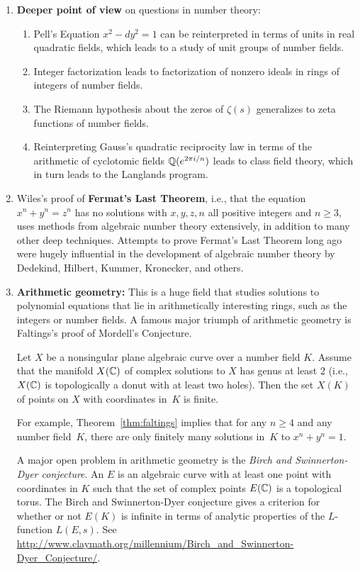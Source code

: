 \begin{enumerate}
\item {\bf Deeper point of view} on questions in number theory:
\begin{enumerate}
\item Pell's Equation $x^2-dy^2=1$ can be reinterpreted in terms of units in real quadratic fields, which
leads to a study of unit groups of number fields.
\item Integer factorization leads to factorization of nonzero ideals in rings of integers of number fields.
\item The Riemann hypothesis about the zeros of $\zeta(s)$ generalizes to zeta functions of number fields.
\item Reinterpreting Gauss's quadratic reciprocity law in terms of the
  arithmetic of cyclotomic fields $\mathbb{Q}(e^{2\pi i/n})$ leads to class
  field theory, which in turn leads to the Langlands program.
\end{enumerate}
\item Wiles's proof of {\bf Fermat's Last Theorem}, i.e., that the
equation $x^n+y^n=z^n$ has no solutions with $x,y,z,n$ all positive
integers and $n\geq 3$, uses methods from
algebraic number theory extensively, in addition to many other deep
techniques.  Attempts to prove Fermat's Last Theorem long ago were
hugely influential in the development of algebraic number theory
by Dedekind, Hilbert, Kummer, Kronecker, and others.
\item {\bf Arithmetic geometry:} This is a huge field that studies
solutions to polynomial equations that lie in arithmetically
interesting rings, such as the integers or number fields.  A famous
major triumph of arithmetic geometry is Faltings's proof of Mordell's
Conjecture.
\begin{theorem}[Faltings] \label{thm:faltings}
Let $X$ be a nonsingular plane algebraic curve over a number
field $K$.  Assume that the manifold $X(\mathbb{C})$ of complex solutions to
$X$ has genus at least $2$ (i.e., $X(\mathbb{C})$ is topologically a donut
with at least two holes).  Then the set $X(K)$ of points on $X$ with
coordinates in~$K$ is finite.
\end{theorem}  
For example, Theorem~\ref{thm:faltings} implies that for any $n\geq 4$
and any number field~$K$, there are only finitely many solutions
in~$K$ to $x^n+y^n=1$.  

A major open problem in arithmetic geometry is the {\em Birch
  and Swinnerton-Dyer conjecture}. 
An  $E$ is an algebraic curve with at least one point
with coordinates in $K$ such that the set of complex points
$E(\mathbb{C})$ is a topological torus.
The Birch and Swinnerton-Dyer conjecture gives a
criterion for whether or not $E(K)$ is infinite in
terms of analytic properties of the $L$-function $L(E,s)$.
See \url{http://www.claymath.org/millennium/Birch_and_Swinnerton-Dyer_Conjecture/}.

\end{enumerate}


